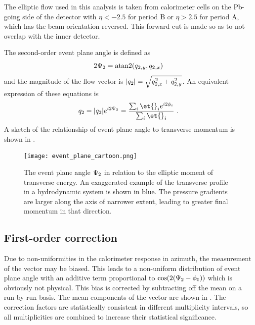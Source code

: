 The elliptic flow used in this analysis is taken from calorimeter cells on the Pb-going side of the detector with $\eta < -2.5$ for period B or $\eta > 2.5$ for period A, which has the beam orientation reversed. This forward cut is made so as to not overlap with the inner detector.

The second-order event plane angle \psit is defined as
\begin{equation}
2\Psi_{2} = \mathrm{atan2}(q_{2}{}_{,y},q_{2}{}_{,x})
\end{equation}
and the magnitude of the flow vector is $|q_{2}| = \sqrt{q_{2,x}^2 + q_{2,y}^2}$.
An equivalent expression of these equations is
\[
\qt = |\qt| e^{i2\psit} = \frac{\sum_i \et{}_i e^{i2\phi_i}}{\sum_i \et{}_i} \; .
\]
A sketch of the relationship of event plane angle to transverse momentum is shown in .

\begin{figure}[t]
  \centering
  \texttt{[image: event\_plane\_cartoon.png]}
  \caption{The event plane angle $\Psi_{2}$ in relation to the elliptic moment of transverse energy. An exaggerated example of the transverse profile in a hydrodynamic system is shown in blue. The pressure gradients are larger along the axis of narrower extent, leading to greater final momentum in that direction.}
\label{fig:ep_cartoon}
\end{figure}

\subsection{First-order correction}
Due to non-uniformities in the calorimeter response in azimuth, the measurement of the \qt vector may be biased. This leads to a non-uniform distribution of event plane angle \psit with an additive term proportional to $\cos (2(\Psi_{2} - \phi_0))$ which is obviously not physical.
This bias is corrected by subtracting off the mean \qt on a run-by-run basis.
The mean components of the \qt vector are shown in .
The correction factors are statistically consistent in different multiplicity intervals, so all multiplicities are combined to increase their statistical significance.

